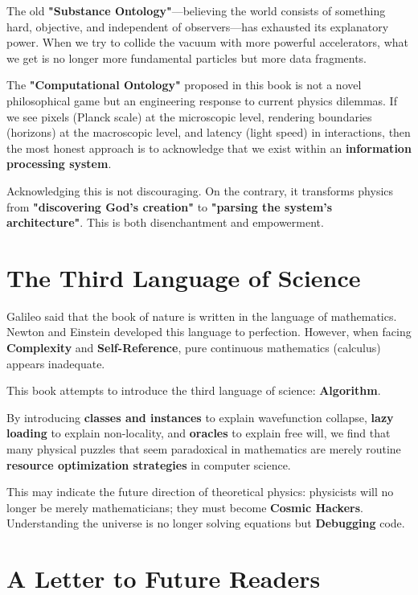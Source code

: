 The old \textbf{"Substance Ontology"}—believing the world consists of something hard, objective, and independent of observers—has exhausted its explanatory power. When we try to collide the vacuum with more powerful accelerators, what we get is no longer more fundamental particles but more data fragments.

The \textbf{"Computational Ontology"} proposed in this book is not a novel philosophical game but an engineering response to current physics dilemmas. If we see pixels (Planck scale) at the microscopic level, rendering boundaries (horizons) at the macroscopic level, and latency (light speed) in interactions, then the most honest approach is to acknowledge that we exist within an \textbf{information processing system}.

Acknowledging this is not discouraging. On the contrary, it transforms physics from \textbf{"discovering God's creation"} to \textbf{"parsing the system's architecture"}. This is both disenchantment and empowerment.

\section{The Third Language of Science}

Galileo said that the book of nature is written in the language of mathematics. Newton and Einstein developed this language to perfection. However, when facing \textbf{Complexity} and \textbf{Self-Reference}, pure continuous mathematics (calculus) appears inadequate.

This book attempts to introduce the third language of science: \textbf{Algorithm}.

By introducing \textbf{classes and instances} to explain wavefunction collapse, \textbf{lazy loading} to explain non-locality, and \textbf{oracles} to explain free will, we find that many physical puzzles that seem paradoxical in mathematics are merely routine \textbf{resource optimization strategies} in computer science.

This may indicate the future direction of theoretical physics: physicists will no longer be merely mathematicians; they must become \textbf{Cosmic Hackers}. Understanding the universe is no longer solving equations but \textbf{Debugging} code.

\section{A Letter to Future Readers}

